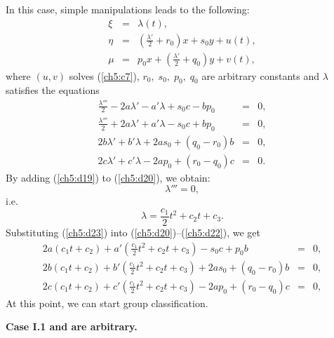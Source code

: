 In this case, simple manipulations leads to the following:
\begin{eqnarray}
\xi &=& \lambda (t),\label{ch5:d16}\\
\eta &=& (\frac{\lambda '}{2}+r_0)x+s_0 y+u(t), \label{ch5:d17}\\
\mu & =& p_0 x+(\frac{\lambda '}{2}+q_0)y+v(t), \label{ch5:d18}
\end{eqnarray}
where $(u,v)$ solves (\ref{ch5:c7}), $r_0,\;s_0,\;p_0,\; q_0$ are arbitrary
constants and  $\lambda$ satisfies the equations
\begin{eqnarray}
\frac{\lambda '''}{2}-2a\lambda '-a'\lambda+s_0 c-bp_0 &=&0,
\label{ch5:d19}\\
\frac{\lambda '''}{2}+2a\lambda '+a'\lambda-s_0 c+bp_0 &=& 0,
\label{ch5:d20}\\
2b\lambda '+b'\lambda+2as_0+(q_0-r_0)b &= & 0 ,\label{ch5:d21}\\
2c\lambda '+c'\lambda-2ap_0+(r_0-q_0)c & =& 0. \label{ch5:d22}
\end{eqnarray}
By adding (\ref{ch5:d19}) to (\ref{ch5:d20}), we obtain:
\[\lambda '''= 0, \]
i.e.
\begin{equation}
\lambda=\frac{c_1}{2}t^2+c_2t+c_3. \label{ch5:d23}
\end{equation}
Substituting (\ref{ch5:d23}) into (\ref{ch5:d20})--(\ref{ch5:d22}), we get
\begin{eqnarray}
2a(c_1t+c_2)+a'(\frac{c_1}{2}t^2+c_2t+c_3)-s_0c+p_0b &=& 0,
\label{ch5:d24}\\
2b(c_1t+c_2)+b'(\frac{c_1}{2}t^2+c_2t+c_3)+2as_0+(q_0-r_0)b &=&0,
\label{ch5:d25}\\
2c(c_1t+c_2)+c'(\frac{c_1}{2}t^2+c_2t+c_3)-2ap_0+(r_0-q_0)c &=&0,
\label{ch5:d26}
\end{eqnarray}
At this point, we can start group classification.

{\bf Case I.1   and  are arbitrary.}


